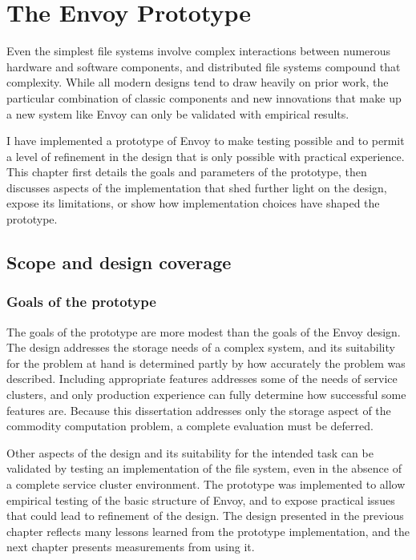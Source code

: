\chapter{The Envoy Prototype}

Even the simplest file systems involve complex interactions between numerous hardware and software components, and distributed file systems compound that complexity. While all modern designs tend to draw heavily on prior work, the particular combination of classic components and new innovations that make up a new system like Envoy can only be validated with empirical results.

I have implemented a prototype of Envoy to make testing possible and to permit a level of refinement in the design that is only possible with practical experience. This chapter first details the goals and parameters of the prototype, then discusses aspects of the implementation that shed further light on the design, expose its limitations, or show how implementation choices have shaped the prototype.

\section{Scope and design coverage}

\subsection{Goals of the prototype}

The goals of the prototype are more modest than the goals of the Envoy design. The design addresses the storage needs of a complex system, and its suitability for the problem at hand is determined partly by how accurately the problem was described. Including appropriate features addresses some of the needs of service clusters, and only production experience can fully determine how successful some features are. Because this dissertation addresses only the storage aspect of the commodity computation problem, a complete evaluation must be deferred.

Other aspects of the design and its suitability for the intended task can be validated by testing an implementation of the file system, even in the absence of a complete service cluster environment. The prototype was implemented to allow empirical testing of the basic structure of Envoy, and to expose practical issues that could lead to refinement of the design. The design presented in the previous chapter reflects many lessons learned from the prototype implementation, and the next chapter presents measurements from using it.

